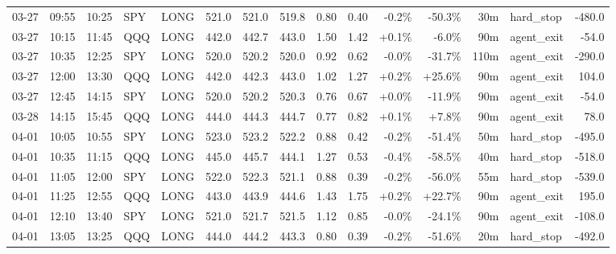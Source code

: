 \documentclass[11pt,a4paper,twoside]{article}
\begin{document}
\begin{landscape}
\begin{center}
\begin{longtable}{>{\color{txtmain}}l l l l l r r r r r r r r >{\color{txtmain}}l r}
03-27 & 09:55 & 10:25 & SPY & LONG & 521.0 & 521.0 & 519.8 & 0.80 & 0.40 & \textcolor{lossred}{-0.2\%} & \textcolor{lossred}{-50.3\%} & 30m & hard\_stop & \textcolor{lossred}{-480.0} \\
03-27 & 10:15 & 11:45 & QQQ & LONG & 442.0 & 442.7 & 443.0 & 1.50 & 1.42 & \textcolor{wingreen}{+0.1\%} & \textcolor{lossred}{-6.0\%} & 90m & agent\_exit & \textcolor{lossred}{-54.0} \\
03-27 & 10:35 & 12:25 & SPY & LONG & 520.0 & 520.2 & 520.0 & 0.92 & 0.62 & \textcolor{lossred}{-0.0\%} & \textcolor{lossred}{-31.7\%} & 110m & agent\_exit & \textcolor{lossred}{-290.0} \\
03-27 & 12:00 & 13:30 & QQQ & LONG & 442.0 & 442.3 & 443.0 & 1.02 & 1.27 & \textcolor{wingreen}{+0.2\%} & \textcolor{wingreen}{+25.6\%} & 90m & agent\_exit & \textcolor{wingreen}{104.0} \\
03-27 & 12:45 & 14:15 & SPY & LONG & 520.0 & 520.2 & 520.3 & 0.76 & 0.67 & \textcolor{wingreen}{+0.0\%} & \textcolor{lossred}{-11.9\%} & 90m & agent\_exit & \textcolor{lossred}{-54.0} \\
03-28 & 14:15 & 15:45 & QQQ & LONG & 444.0 & 444.3 & 444.7 & 0.77 & 0.82 & \textcolor{wingreen}{+0.1\%} & \textcolor{wingreen}{+7.8\%} & 90m & agent\_exit & \textcolor{wingreen}{78.0} \\
04-01 & 10:05 & 10:55 & SPY & LONG & 523.0 & 523.2 & 522.2 & 0.88 & 0.42 & \textcolor{lossred}{-0.2\%} & \textcolor{lossred}{-51.4\%} & 50m & hard\_stop & \textcolor{lossred}{-495.0} \\
04-01 & 10:35 & 11:15 & QQQ & LONG & 445.0 & 445.7 & 444.1 & 1.27 & 0.53 & \textcolor{lossred}{-0.4\%} & \textcolor{lossred}{-58.5\%} & 40m & hard\_stop & \textcolor{lossred}{-518.0} \\
04-01 & 11:05 & 12:00 & SPY & LONG & 522.0 & 522.3 & 521.1 & 0.88 & 0.39 & \textcolor{lossred}{-0.2\%} & \textcolor{lossred}{-56.0\%} & 55m & hard\_stop & \textcolor{lossred}{-539.0} \\
04-01 & 11:25 & 12:55 & QQQ & LONG & 443.0 & 443.9 & 444.6 & 1.43 & 1.75 & \textcolor{wingreen}{+0.2\%} & \textcolor{wingreen}{+22.7\%} & 90m & agent\_exit & \textcolor{wingreen}{195.0} \\
04-01 & 12:10 & 13:40 & SPY & LONG & 521.0 & 521.7 & 521.5 & 1.12 & 0.85 & \textcolor{lossred}{-0.0\%} & \textcolor{lossred}{-24.1\%} & 90m & agent\_exit & \textcolor{lossred}{-108.0} \\
04-01 & 13:05 & 13:25 & QQQ & LONG & 444.0 & 444.2 & 443.3 & 0.80 & 0.39 & \textcolor{lossred}{-0.2\%} & \textcolor{lossred}{-51.6\%} & 20m & hard\_stop & \textcolor{lossred}{-492.0} \\

\end{longtable}
\end{center}
\end{landscape}
\end{document}

